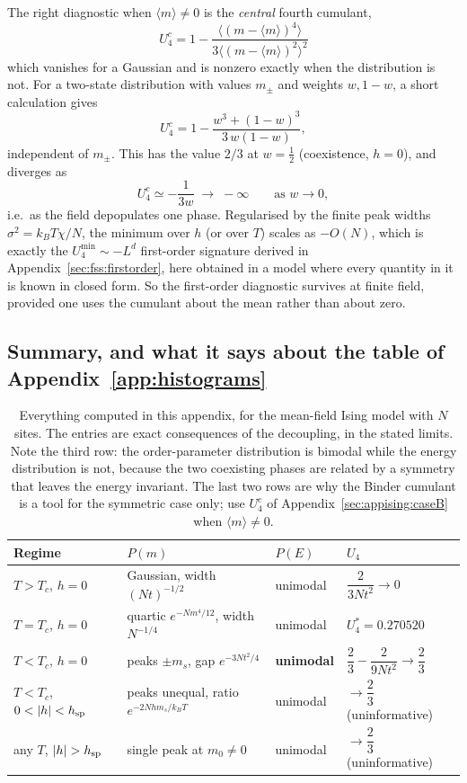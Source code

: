 \documentclass[10pt,a4paper]{article}
\theoremstyle{remark}
\begin{document}
The right diagnostic when $\langle m\rangle\neq0$ is the \emph{central} fourth
cumulant,
\[
\;
U_4^{c}=1-\frac{\big\langle(m-\langle m\rangle)^{4}\big\rangle}
{3\big\langle(m-\langle m\rangle)^{2}\big\rangle^{2}}\
\]
which vanishes for a Gaussian and is nonzero exactly when the distribution is not.
For a two-state distribution with values $m_\pm$ and weights $w,1-w$, a short
calculation gives
\[
U_4^{c}=1-\frac{w^{3}+(1-w)^{3}}{3\,w(1-w)} ,
\]
independent of $m_\pm$. This has the value $2/3$ at $w=\tfrac12$ (coexistence,
$h=0$), and diverges as
\[
U_4^{c}\simeq-\frac{1}{3w}\;\longrightarrow\;-\infty
\qquad\text{as }w\to0 ,
\]
i.e.\ as the field depopulates one phase. Regularised by the finite peak widths
$\sigma^{2}=k_BT\chi/N$, the minimum over $h$ (or over $T$) scales as $-O(N)$,
which is exactly the $U_4^{\min}\sim-L^{d}$ first-order signature derived in
Appendix~\ref{sec:fss:firstorder}, here obtained in a model where every quantity in
it is known in closed form. So the first-order diagnostic survives at finite
field, provided one uses the cumulant about the mean rather than about zero.

\subsection{Summary, and what it says about the table of Appendix~\ref{app:histograms}}
\label{sec:appising:table}

\begin{table}[htbp]
\centering
\renewcommand{\arraystretch}{1.3}\small
\begin{tabular}{@{}llll@{}}
\toprule
Regime & $P(m)$ & $P(E)$ & $U_4$ \\
\midrule
$T>T_c$, $h=0$ & Gaussian, width $(Nt)^{-1/2}$ & unimodal
  & $\dfrac{2}{3Nt^{2}}\to0$ \\
$T=T_c$, $h=0$ & quartic $e^{-Nm^{4}/12}$, width $N^{-1/4}$ & unimodal
  & $U_4^{\ast}=0.270520$ \\
$T<T_c$, $h=0$ & peaks $\pm m_s$, gap $e^{-3Nt^{2}/4}$
  & \textbf{unimodal} & $\dfrac23-\dfrac{2}{9Nt^{2}}\to\dfrac23$ \\
$T<T_c$, $0<|h|<h_{\rm sp}$ & peaks unequal, ratio $e^{-2Nhm_s/k_BT}$ & unimodal
  & $\to\dfrac23$ (uninformative) \\
any $T$, $|h|>h_{\rm sp}$ & single peak at $m_0\neq0$ & unimodal
  & $\to\dfrac23$ (uninformative) \\
\bottomrule
\end{tabular}
\caption{Everything computed in this appendix, for the mean-field Ising model
with $N$ sites. The entries are exact consequences of the decoupling, in the
stated limits. Note the
third row: the order-parameter distribution is bimodal while the energy
distribution is not, because the two coexisting phases are related by a symmetry
that leaves the energy invariant. The last two rows are why the Binder cumulant
is a tool for the symmetric case only; use $U_4^{c}$ of
Appendix~\ref{sec:appising:caseB} when $\langle m\rangle\neq0$.}
\label{tab:appising}
\end{table}
\end{document}
